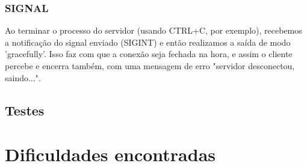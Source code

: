 \documentclass[a4paper]{article}
\begin{document}
\subsubsection{SIGNAL}
Ao terminar o processo do servidor (usando CTRL+C, por exemplo), recebemos a notificação do signal enviado (SIGINT) e então realizamos a saída de modo 'gracefully'. Isso faz com que a conexão seja fechada na hora, e assim o cliente percebe e encerra também, com uma mensagem de erro "servidor desconectou, saindo...".

\subsection{Testes}

\section{Dificuldades encontradas}
 


\end{document}
